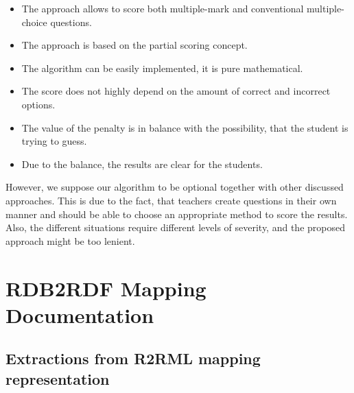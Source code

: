 \begin{itemize}
  \item The approach allows to score both multiple-mark and conventional multiple-choice questions.
  \item The approach is based on the partial scoring concept.
  \item The algorithm can be easily implemented, it is pure mathematical.
  \item The score does not highly depend on the amount of correct and incorrect options.
  \item The value of the penalty is in balance with the possibility, that the student is trying to guess.
  \item Due to the balance, the results are clear for the students.  
\end{itemize}

However, we suppose our algorithm to be optional together with other discussed approaches.
This is due to the fact, that teachers create questions in their own manner and should be able to choose an appropriate method to score the results.
Also, the different situations require different levels of 	
severity, and the proposed approach might be too lenient.




\chapter{RDB2RDF Mapping Documentation}
\label{sec:app1}
\section{Extractions from R2RML mapping representation}
\label{app1:r2rml}

